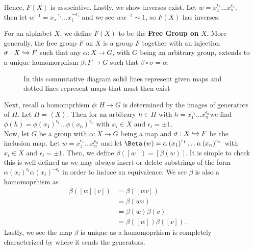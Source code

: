 Hence, \(F\left( X \right) \) is associative. Lastly, we show inverses exist. Let \(w = x_1^{\epsilon_1} \ldots x_{s}^{\epsilon_{s}}\), then let \(w^{-1} = x_{s}^{-\epsilon_{s}} \ldots x_1^{-\epsilon_1}\) and we see \(w w^{-1} \sim 1\), so \(F\left( X \right) \) has inverses.
\begin{definition}
	For an alphabet \(X\), we define \(F\left( X \right) \) to be the \textbf{Free Group on \(X\)}. More generally, the free group \(F\) on \(X\) is a group \(F\) together with an injection \(\sigma: X \xhookrightarrow{} F\) such that any \(\alpha: X \to G\), with \(G\) being an arbitrary group, extends to a unique homomorphism \(\beta: F  \to G \) such that \(\beta \circ \sigma = \alpha\).
\end{definition}
\begin{figure}[ht]
    \centering
    \caption{In this commutative diagram solid lines represent given maps and dotted lines represent maps that must then exist}
    \label{fig:fig}
\end{figure}
Next, recall a homomprhism \(\phi : H \to G\) is determined by the images of generators of \(H\). Let \(H = \left<X \right> \). Then for an arbitrary \(h \in H\) with \(h = x_1^{\epsilon_1} \ldots x_{n}^{\epsilon _{n}}\)we find \(\phi\left( h \right)  = \phi\left( x_1 \right) ^{\epsilon_1} \ldots \phi\left( x_{n} \right) ^{\epsilon_{n}}\) with \(x_{i} \in X\) and \(\epsilon_{i} = \pm 1\).\\
Now, let \(G\) be a group with \(\alpha : X \to G\) being a map and \(\sigma:X \xhookrightarrow{} F\) be the inclusion map. Let \(w = x_1^{\epsilon_1} \ldots x_{n}^{\epsilon_{n}}\) and let \(\Beta\left( w \right) = \alpha\left( x_1 \right) ^{\epsilon_1} \ldots \alpha\left( x_{n} \right) ^{\epsilon _{n}}\) with \(x_{i} \in X\) and \(\epsilon_{i} = \pm 1\). Then, we define \(\beta \left( \left[ w \right]  \right)  = \left[ \beta \left( w \right)  \right] \). It is simple to check this is well defined as we may always insert or delete substrings of the form \(\alpha\left( x_{i} \right) ^{\epsilon_{i}} \alpha\left( x_{i} \right) ^{-\epsilon_{i}}\) in order to induce an equivalence. We see \(\beta\) is also a homomoprhism as
\begin{align*}
	\beta\left( \left[ w \right] \left[ v \right]  \right) &= \beta\left( \left[ wv \right]  \right)  \\
							       &= \beta\left( wv \right)  \\
							       &= \beta\left( w \right) \beta\left( v \right)  \\
							       &= \beta\left( \left[ w \right]  \right) \beta\left( \left[ v \right]  \right)
.\end{align*}
Lastly, we see the map \(\beta\) is unique as a homomoprhism is completely characterized by where it sends the generators.
